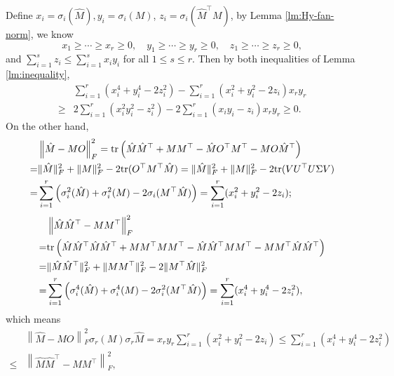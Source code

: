 \documentclass[11pt]{article}
\newcommand{\0}{{\mathbf{0}}}
\newcommand{\1}{{\mathbf{1}}}
\newcommand{\tr}{{\rm tr}}
\begin{document}
Define $x_i = \sigma_i(\hat{M}), y_i = \sigma_i(M)$, $z_i = \sigma_i(\hat{M}^\top M)$, by Lemma \ref{lm:Hy-fan-norm}, we know
\begin{equation*}
x_1\geq \cdots \geq x_r \geq 0, \quad y_1\geq \cdots \geq y_r \geq 0,\quad z_1\geq \cdots \geq z_r \geq 0,
\end{equation*}
and $\sum_{i=1}^s z_i \leq \sum_{i=1}^s x_iy_i$ for all $1\leq s \leq r$. Then by both inequalities of Lemma \ref{lm:inequality}, 
\begin{equation*}
\begin{split}
& \sum_{i=1}^r (x_i^4 + y_i^4 - 2z_i^2) - \sum_{i=1}^r\left(x_i^2+y_i^2-2z_i\right)x_ry_r\\
\geq & 2\sum_{i=1}^r (x_i^2y_i^2 - z_i^2) - 2\sum_{i=1}^r (x_iy_i - z_i)x_ry_r \geq 0.
\end{split}
\end{equation*}
On the other hand,
\begin{equation*}
\begin{split}
& \left\|\hat{M} - MO\right\|_F^2 = \tr\left(\hat{M}\hat{M}^\top + MM^\top - \hat{M} O^\top M^\top - M O \hat{M}^\top \right)\\
= & \|\hat{M}\|_F^2 + \|M\|_F^2 - 2\tr(O^\top M^\top \hat{M}) = \|\hat{M}\|_F^2 + \|M\|_F^2 - 2\tr(V U^\top U \Sigma V)\\
= & \sum_{i=1}^r \left(\sigma_i^2(\hat{M}) + \sigma_i^2(M) - 2 \sigma_i(M^\top\hat{M})\right) = \sum_{i=1}^r(x_i^2+y_i^2-2z_i);
\end{split}
\end{equation*}
\begin{equation*}
\begin{split}
& \left\|\hat{M}\hat{M}^\top - MM^\top \right\|_F^2 \\
= & \tr\left(\hat{M}\hat{M}^\top\hat{M}\hat{M}^\top + MM^\top MM^\top - \hat{M}\hat{M}^\top MM^\top - MM^\top \hat{M}\hat{M}^\top \right)\\
= & \|\hat{M}\hat{M}^\top\|_F^2 + \|MM^\top\|_F^2 - 2\|M^\top \hat{M}\|_F^2 \\
= & \sum_{i=1}^r \left(\sigma_i^4(\hat{M}) + \sigma_i^4(M) - 2 \sigma_i^2(M^\top \hat{M}) \right) = \sum_{i=1}^r(x_i^4 + y_i^4 - 2z_i^2),
\end{split}
\end{equation*}
which means
\begin{equation*}
\begin{split}
& \left\|\hat{M}-MO\right\|_F^2\sigma_{r}(M)\sigma_r\hat{M} = x_ry_r\sum_{i=1}^r (x_i^2+y_i^2 - 2z_i)\leq \sum_{i=1}^r \left(x_i^4+y_i^4 - 2z_i^2\right)\\
\leq & \left\|\hat{M}\hat{M}^\top - MM^\top\right\|_F^2,
\end{split}
\end{equation*}
\end{document}

